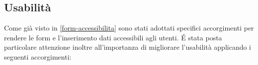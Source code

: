 \subsection{Usabilità}
\label{form-usabilita}
Come già visto in \ref{form-accessibilita} sono stati adottati specifici accorgimenti per rendere le form e l'inserimento dati accessibili agli utenti. \'E stata posta particolare attenzione inoltre all'importanza di migliorare l'usabilità applicando i seguenti accorgimenti: %
